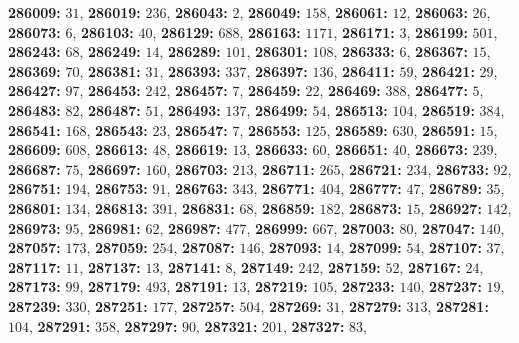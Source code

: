 \textsf{\bfseries 286009:} $31$, \textsf{\bfseries 286019:} $236$, \textsf{\bfseries 286043:} $2$, \textsf{\bfseries 286049:} $158$, \textsf{\bfseries 286061:} $12$, \textsf{\bfseries 286063:} $26$, \textsf{\bfseries 286073:} $6$, \textsf{\bfseries 286103:} $40$, \textsf{\bfseries 286129:} $688$, \textsf{\bfseries 286163:} $1171$, \textsf{\bfseries 286171:} $3$, \textsf{\bfseries 286199:} $501$, \textsf{\bfseries 286243:} $68$, \textsf{\bfseries 286249:} $14$, \textsf{\bfseries 286289:} $101$, \textsf{\bfseries 286301:} $108$, \textsf{\bfseries 286333:} $6$, \textsf{\bfseries 286367:} $15$, \textsf{\bfseries 286369:} $70$, \textsf{\bfseries 286381:} $31$, \textsf{\bfseries 286393:} $337$, \textsf{\bfseries 286397:} $136$, \textsf{\bfseries 286411:} $59$, \textsf{\bfseries 286421:} $29$, \textsf{\bfseries 286427:} $97$, \textsf{\bfseries 286453:} $242$, \textsf{\bfseries 286457:} $7$, \textsf{\bfseries 286459:} $22$, \textsf{\bfseries 286469:} $388$, \textsf{\bfseries 286477:} $5$, \textsf{\bfseries 286483:} $82$, \textsf{\bfseries 286487:} $51$, \textsf{\bfseries 286493:} $137$, \textsf{\bfseries 286499:} $54$, \textsf{\bfseries 286513:} $104$, \textsf{\bfseries 286519:} $384$, \textsf{\bfseries 286541:} $168$, \textsf{\bfseries 286543:} $23$, \textsf{\bfseries 286547:} $7$, \textsf{\bfseries 286553:} $125$, \textsf{\bfseries 286589:} $630$, \textsf{\bfseries 286591:} $15$, \textsf{\bfseries 286609:} $608$, \textsf{\bfseries 286613:} $48$, \textsf{\bfseries 286619:} $13$, \textsf{\bfseries 286633:} $60$, \textsf{\bfseries 286651:} $40$, \textsf{\bfseries 286673:} $239$, \textsf{\bfseries 286687:} $75$, \textsf{\bfseries 286697:} $160$, \textsf{\bfseries 286703:} $213$, \textsf{\bfseries 286711:} $265$, \textsf{\bfseries 286721:} $234$, \textsf{\bfseries 286733:} $92$, \textsf{\bfseries 286751:} $194$, \textsf{\bfseries 286753:} $91$, \textsf{\bfseries 286763:} $343$, \textsf{\bfseries 286771:} $404$, \textsf{\bfseries 286777:} $47$, \textsf{\bfseries 286789:} $35$, \textsf{\bfseries 286801:} $134$, \textsf{\bfseries 286813:} $391$, \textsf{\bfseries 286831:} $68$, \textsf{\bfseries 286859:} $182$, \textsf{\bfseries 286873:} $15$, \textsf{\bfseries 286927:} $142$, \textsf{\bfseries 286973:} $95$, \textsf{\bfseries 286981:} $62$, \textsf{\bfseries 286987:} $477$, \textsf{\bfseries 286999:} $667$, \textsf{\bfseries 287003:} $80$, \textsf{\bfseries 287047:} $140$, \textsf{\bfseries 287057:} $173$, \textsf{\bfseries 287059:} $254$, \textsf{\bfseries 287087:} $146$, \textsf{\bfseries 287093:} $14$, \textsf{\bfseries 287099:} $54$, \textsf{\bfseries 287107:} $37$, \textsf{\bfseries 287117:} $11$, \textsf{\bfseries 287137:} $13$, \textsf{\bfseries 287141:} $8$, \textsf{\bfseries 287149:} $242$, \textsf{\bfseries 287159:} $52$, \textsf{\bfseries 287167:} $24$, \textsf{\bfseries 287173:} $99$, \textsf{\bfseries 287179:} $493$, \textsf{\bfseries 287191:} $13$, \textsf{\bfseries 287219:} $105$, \textsf{\bfseries 287233:} $140$, \textsf{\bfseries 287237:} $19$, \textsf{\bfseries 287239:} $330$, \textsf{\bfseries 287251:} $177$, \textsf{\bfseries 287257:} $504$, \textsf{\bfseries 287269:} $31$, \textsf{\bfseries 287279:} $313$, \textsf{\bfseries 287281:} $104$, \textsf{\bfseries 287291:} $358$, \textsf{\bfseries 287297:} $90$, \textsf{\bfseries 287321:} $201$, \textsf{\bfseries 287327:} $83$, 
